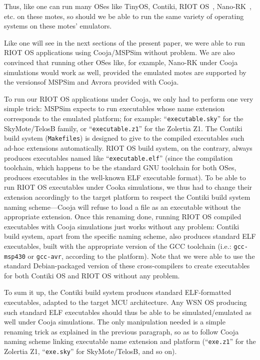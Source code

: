 \documentclass[10pt]{ewsn-proc}
\begin{document}
Thus, like one can run many OSes like TinyOS, Contiki, RIOT OS~\cite{RIOT},
Nano-RK~\cite{NanoRK}, etc. on these motes, so should we be able to run
the same variety of operating systems on these motes' emulators.

Like one will see in the next sections of the present paper, we were
able to run RIOT OS applications using Cooja/MSPSim without problem.
We are also convinced that running other OSes like, for example,
Nano-RK under Cooja simulations would work as well, provided
the emulated motes are supported by the versionsof MSPSim
and Avrora provided with Cooja.

\smallskip

To run our RIOT OS applications under Cooja, we only had to perform one
very simple trick: MSPSim expects to run executables whose name extension
corresponds to the emulated platform; for example:
``\texttt{executable.sky}'' for the SkyMote/TelosB family, or
``\texttt{executable.z1}'' for the Zolertia Z1. The Contiki build system
(\texttt{Makefiles}) is designed to give to the compiled executables
such ad-hoc extensions automatically. RIOT OS build system, on the
contrary, always produces executables named like ``\texttt{executable.elf}''
(since the compilation toolchain, which happens to be the standard GNU
toolchain for both OSes, produces executables in the well-known ELF
executable format). To be able to run RIOT OS executables under Cooka
simulations, we thus had to change their extension accordingly to the
target platform to respect the Contiki build system naming scheme---Cooja
will refuse to load a file as an executable without the appropriate
extension. Once this renaming done, running RIOT OS compiled executables
with Cooja simulations just works without any problem: Contiki build
system, apart from the specific naming scheme, also produces standard
ELF executables, built with the appropriate version of the GCC toolchain
(i.e.: \texttt{gcc-msp430} or \texttt{gcc-avr}, according to the platform).
Note that we were able to use the standard Debian-packaged version of
these cross-compilers to create executables for both Contiki OS and
RIOT OS without any problem.

To sum it up, the Contiki build system produces standard ELF-formatted
executables, adapted to the target MCU architecture. Any WSN OS producing
such standard ELF executables should thus be able to be simulated/emulated
as well under Cooja simulations. The only manipulation needed is a simple
renaming trick as explained in the previous paragraph, so as to follow
Cooja naming scheme linking executable name extension and platform
(``\texttt{exe.z1}'' for the Zolertia Z1, ``\texttt{exe.sky}'' for
SkyMote/TelosB, and so on).
\end{document}
